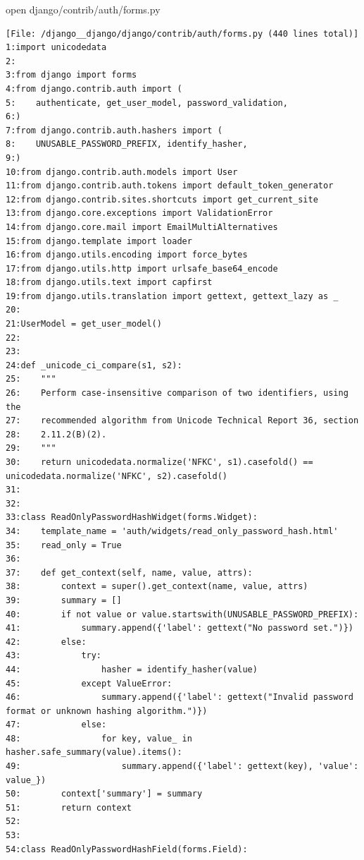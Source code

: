 {\begin{agentbox}
\hrulefill
\begin{CodeVerbatim}[breaklines=true, breakanywhere=true]
open django/contrib/auth/forms.py
\end{CodeVerbatim}
\end{agentbox}
\begin{observationbox}\begin{Verbatim}[breaklines=true, breakanywhere=true]
[File: /django__django/django/contrib/auth/forms.py (440 lines total)]
1:import unicodedata
2:
3:from django import forms
4:from django.contrib.auth import (
5:    authenticate, get_user_model, password_validation,
6:)
7:from django.contrib.auth.hashers import (
8:    UNUSABLE_PASSWORD_PREFIX, identify_hasher,
9:)
10:from django.contrib.auth.models import User
11:from django.contrib.auth.tokens import default_token_generator
12:from django.contrib.sites.shortcuts import get_current_site
13:from django.core.exceptions import ValidationError
14:from django.core.mail import EmailMultiAlternatives
15:from django.template import loader
16:from django.utils.encoding import force_bytes
17:from django.utils.http import urlsafe_base64_encode
18:from django.utils.text import capfirst
19:from django.utils.translation import gettext, gettext_lazy as _
20:
21:UserModel = get_user_model()
22:
23:
24:def _unicode_ci_compare(s1, s2):
25:    """
26:    Perform case-insensitive comparison of two identifiers, using the
27:    recommended algorithm from Unicode Technical Report 36, section
28:    2.11.2(B)(2).
29:    """
30:    return unicodedata.normalize('NFKC', s1).casefold() == unicodedata.normalize('NFKC', s2).casefold()
31:
32:
33:class ReadOnlyPasswordHashWidget(forms.Widget):
34:    template_name = 'auth/widgets/read_only_password_hash.html'
35:    read_only = True
36:
37:    def get_context(self, name, value, attrs):
38:        context = super().get_context(name, value, attrs)
39:        summary = []
40:        if not value or value.startswith(UNUSABLE_PASSWORD_PREFIX):
41:            summary.append({'label': gettext("No password set.")})
42:        else:
43:            try:
44:                hasher = identify_hasher(value)
45:            except ValueError:
46:                summary.append({'label': gettext("Invalid password format or unknown hashing algorithm.")})
47:            else:
48:                for key, value_ in hasher.safe_summary(value).items():
49:                    summary.append({'label': gettext(key), 'value': value_})
50:        context['summary'] = summary
51:        return context
52:
53:
54:class ReadOnlyPasswordHashField(forms.Field):

\end{Verbatim}
\end{observationbox}}

